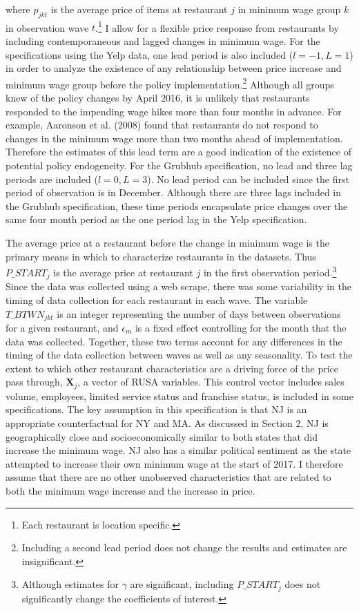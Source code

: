 \documentclass[11pt]{article}
\begin{document}
\noindent where $p_{jkt}$ is the average price of items at restaurant $j$ in minimum wage group $k$ in observation wave $t$.\footnote{Each restaurant is location specific.} I allow for a flexible price response from restaurants by including contemporaneous and lagged changes in minimum wage. For the specifications using the Yelp data, one lead period is also included ($l=-1, L=1$) in order to analyze the existence of any relationship between price increase and minimum wage group before the policy implementation.\footnote{Including a second lead period does not change the results and estimates are insignificant.} Although all groups knew of the policy changes by April 2016, it is unlikely that restaurants responded to the impending wage hikes more than four months in advance. For example, Aaronson et al. (2008) found that restaurants do not respond to changes in the minimum wage more than two months ahead of implementation. Therefore the estimates of this lead term are a good indication of the existence of potential policy endogeneity. For the Grubhub specification, no lead and three lag periods are included ($l=0, L=3$). No lead period can be included since the first period of observation is in December. Although there are three lags included in the Grubhub specification, these time periods encapsulate price changes over the same four month period as the one period lag in the Yelp specification. 

The average price at a restaurant before the change in minimum wage is the primary means in which to characterize restaurants in the datasets. Thus $P\_START_{j}$ is the average price at restaurant $j$ in the first observation period.\footnote{Although estimates for $\gamma$ are significant, including $P\_START_{j}$ does not significantly change the coefficients of interest.} Since the data was collected using a web scrape, there was some variability in the timing of data collection for each restaurant in each wave. The variable $T\_BTWN_{jkt}$ is an integer representing the number of days between observations for a given restaurant, and $\epsilon_m$ is a fixed effect controlling for the month that the data was collected. Together, these two terms account for any differences in the timing of the data collection between waves as well as any seasonality. To test the extent to which other restaurant characteristics are a driving force of the price pass through, $\boldsymbol{X}_j$, a vector of RUSA variables. This control vector includes sales volume, employees, limited service status and franchise status, is included in some specifications. The key assumption in this specification is that NJ is an appropriate counterfactual for NY and MA. As discussed in Section 2, NJ is geographically close and socioeconomically similar to both states that did increase the minimum wage. NJ also has a similar political sentiment as the state attempted to increase their own minimum wage at the start of 2017. I therefore assume that there are no other unobserved characteristics that are related to both the minimum wage increase and the increase in price. 
\end{document}
